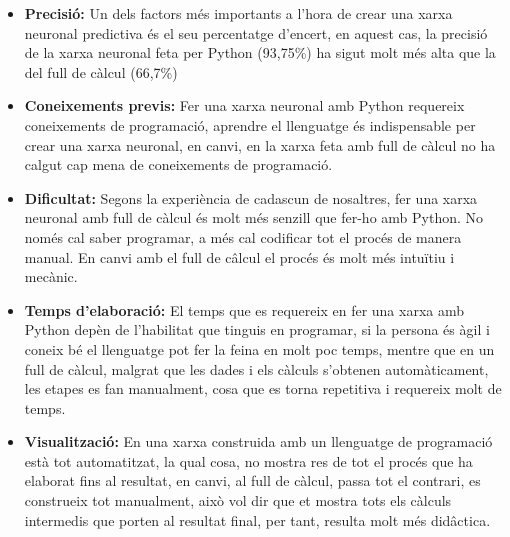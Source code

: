 \begin{itemize}

 \item \textbf{Precisió:} Un dels factors més importants a l'hora de crear una xarxa neuronal predictiva és el seu percentatge d'encert, en aquest cas, la precisió de la xarxa neuronal feta per Python (93,75\%) ha sigut molt més alta que la del full de càlcul (66,7\%)

 \item \textbf{Coneixements previs:} Fer una xarxa neuronal amb Python requereix coneixements de programació, aprendre el llenguatge és indispensable per crear una xarxa neuronal, en canvi, en la xarxa feta amb full de càlcul no ha calgut cap mena de coneixements de programació.

  \item \textbf{Dificultat:} Segons la experiència de cadascun de nosaltres, fer una xarxa neuronal amb full de càlcul és molt més senzill que fer-ho amb Python. No només cal saber programar, a més cal codificar tot el procés de manera manual. En canvi amb el full de câlcul el procés és molt més intuïtiu i mecànic.

  \item \textbf{Temps d'elaboració:} El temps que es requereix en fer una xarxa amb Python depèn de l'habilitat que tinguis en programar, si la persona és àgil i coneix bé el llenguatge pot fer la feina en molt poc temps, mentre que en un full de càlcul, malgrat que les dades i els càlculs s'obtenen automàticament, les etapes es fan manualment, cosa que es torna repetitiva i requereix molt de temps.

  \item \textbf{Visualització:} En una xarxa construida amb un llenguatge de programació està tot automatitzat, la qual cosa, no mostra res de tot el procés que ha elaborat fins al resultat, en canvi, al full de càlcul, passa tot el contrari, es construeix tot manualment, això vol dir que et mostra tots els càlculs intermedis que porten al resultat final, per tant, resulta molt més didâctica.

\end{itemize}

